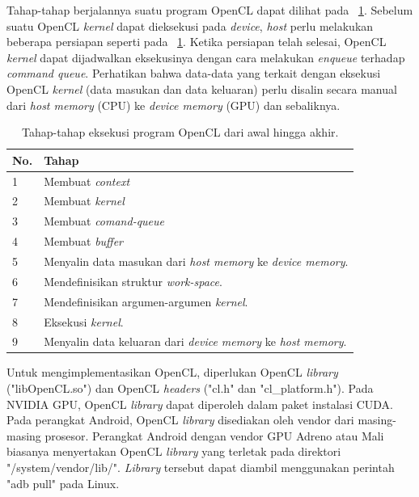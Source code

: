 Tahap-tahap berjalannya suatu program OpenCL dapat dilihat pada \tab~\ref{tab:OpenCLexecutionorder}. Sebelum suatu OpenCL \textit{kernel} dapat dieksekusi pada \textit{device}, \textit{host} perlu melakukan beberapa persiapan seperti pada \tab~\ref{tab:OpenCLexecutionorder}. Ketika persiapan telah selesai, OpenCL \textit{kernel} dapat dijadwalkan eksekusinya dengan cara melakukan \textit{enqueue} terhadap \textit{command queue}. Perhatikan bahwa data-data yang terkait dengan eksekusi OpenCL \textit{kernel} (data masukan dan data keluaran) perlu disalin secara manual dari \textit{host memory} (CPU) ke \textit{device memory} (GPU) dan sebaliknya.

\begin{table}
	\centering
	\caption{Tahap-tahap eksekusi program OpenCL dari awal hingga akhir.}
	\label{tab:OpenCLexecutionorder}
	\begin{tabular}{| l | l |}
		\hline
		\textbf{No.} & \textbf{Tahap}\\ 
		\hline
		1 & Membuat \textit{context} \\ 
		\hline 
		2 & Membuat \textit{kernel}\\ 
		\hline 
		3 & Membuat \textit{comand-queue}\\ 
		\hline
		4 & Membuat \textit{buffer}\\ 
		\hline
		5 & Menyalin data masukan dari \textit{host memory} ke \textit{device memory}.\\
		\hline
		6 & Mendefinisikan struktur \textit{work-space}.\\
		\hline
		7 & Mendefinisikan argumen-argumen \textit{kernel}.\\
		\hline
		8 & Eksekusi \textit{kernel}. \\
		\hline
		9 & Menyalin data keluaran dari 
		\textit{device memory} ke \textit{host memory}. \\
		\hline
	\end{tabular}
\end{table}				

Untuk mengimplementasikan OpenCL, diperlukan OpenCL \textit{library} ("libOpenCL.so") dan OpenCL \textit{headers} ("cl.h" dan "cl\_platform.h"). Pada NVIDIA GPU, OpenCL \textit{library} dapat diperoleh dalam paket instalasi CUDA. Pada perangkat Android, OpenCL \textit{library} disediakan oleh vendor dari masing-masing prosesor. Perangkat Android dengan vendor GPU Adreno atau Mali biasanya menyertakan OpenCL \textit{library} yang terletak pada direktori "/system/vendor/lib/". \textit{Library} tersebut dapat diambil menggunakan perintah "adb pull" pada Linux.

